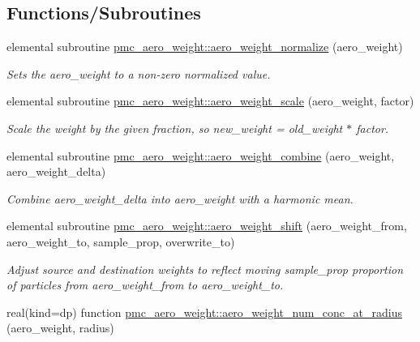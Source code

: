 \subsection*{Functions/\+Subroutines}
\begin{DoxyCompactItemize}
\item 
elemental subroutine \mbox{\hyperlink{namespacepmc__aero__weight_acd4fbc759a69ec55409de3aa8aa16698}{pmc\+\_\+aero\+\_\+weight\+::aero\+\_\+weight\+\_\+normalize}} (aero\+\_\+weight)
\begin{DoxyCompactList}\small\item\em Sets the {\ttfamily aero\+\_\+weight} to a non-\/zero normalized value. \end{DoxyCompactList}\item 
elemental subroutine \mbox{\hyperlink{namespacepmc__aero__weight_a579fef892d29e49b507db823d2e0379a}{pmc\+\_\+aero\+\_\+weight\+::aero\+\_\+weight\+\_\+scale}} (aero\+\_\+weight, factor)
\begin{DoxyCompactList}\small\item\em Scale the weight by the given fraction, so {\ttfamily new\+\_\+weight = old\+\_\+weight $\ast$ factor}. \end{DoxyCompactList}\item 
elemental subroutine \mbox{\hyperlink{namespacepmc__aero__weight_a59ef26ebd83b97722ed819972ba7b78d}{pmc\+\_\+aero\+\_\+weight\+::aero\+\_\+weight\+\_\+combine}} (aero\+\_\+weight, aero\+\_\+weight\+\_\+delta)
\begin{DoxyCompactList}\small\item\em Combine {\ttfamily aero\+\_\+weight\+\_\+delta} into {\ttfamily aero\+\_\+weight} with a harmonic mean. \end{DoxyCompactList}\item 
elemental subroutine \mbox{\hyperlink{namespacepmc__aero__weight_aaebf43b0695852cc82ee916fc4341dd3}{pmc\+\_\+aero\+\_\+weight\+::aero\+\_\+weight\+\_\+shift}} (aero\+\_\+weight\+\_\+from, aero\+\_\+weight\+\_\+to, sample\+\_\+prop, overwrite\+\_\+to)
\begin{DoxyCompactList}\small\item\em Adjust source and destination weights to reflect moving {\ttfamily sample\+\_\+prop} proportion of particles from {\ttfamily aero\+\_\+weight\+\_\+from} to {\ttfamily aero\+\_\+weight\+\_\+to}. \end{DoxyCompactList}\item 
real(kind=dp) function \mbox{\hyperlink{namespacepmc__aero__weight_aca13cabb919a67bd13c75333b7a8daa9}{pmc\+\_\+aero\+\_\+weight\+::aero\+\_\+weight\+\_\+num\+\_\+conc\+\_\+at\+\_\+radius}} (aero\+\_\+weight, radius)

\end{DoxyCompactItemize}

